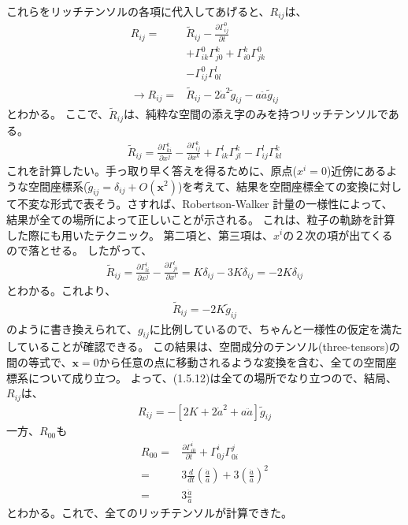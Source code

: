 \documentclass[11pt]{ltjsarticle}
\theoremstyle{plain}
\theoremstyle{break}
\newcommand{\tilg}{\tilde{g}}
\begin{document}
これらをリッチテンソルの各項に代入してあげると、$R_{ij}$は、
\begin{align}
  R_{ij} =&\tilde{R}_{ij}
  -\frac{\partial \Gamma_{i j}^{0}}{\partial t}\\
  &+\Gamma_{i k}^{0} \Gamma_{j 0}^{k}+\Gamma_{i 0}^{k} \Gamma_{j k}^{0} \\
  &-\Gamma_{i j}^{0} \Gamma_{0 l}^{l} \\
\rightarrow
  R_{ij} =&\tilde{R}_{ij} - 2 \dot{a}^2 \tilg_{ij} - a \ddot{a} \tilg_{ij}
\end{align}
とわかる。
ここで、$\tilde{R}_{ij}$は、純粋な空間の添え字のみを持つリッチテンソルである。
\begin{align}
\tilde{R}_{i j}=\frac{\partial \Gamma_{k i}^{k}}{\partial x^{j}}-\frac{\partial \Gamma_{i j}^{k}}{\partial x^{k}}+\Gamma_{i k}^{l} \Gamma_{j l}^{k}-\Gamma_{i j}^{l} \Gamma_{k l}^{k}
\end{align}%
これを計算したい。手っ取り早く答えを得るために、原点($x^i =0$)近傍にあるような空間座標系($\tilg_{ij} = \delta_{ij} + O(\mathbf{x}^2)$)を考えて、結果を空間座標全ての変換に対して不変な形式で表そう。さすれば、Robertson-Walker 計量の一様性によって、結果が全ての場所によって正しいことが示される。
これは、粒子の軌跡を計算した際にも用いたテクニック。
第二項と、第三項は、$x^i$の２次の項が出てくるので落とせる。
したがって、
\begin{align}
  \tilde{R}_{i j}=\frac{\partial \Gamma_{l i}^{l}}{\partial x^{j}}-\frac{\partial \Gamma_{j i}^{l}}{\partial x^{l}}=K \delta_{i j}-3 K \delta_{i j}=-2 K \delta_{i j}
 \end{align}%
とわかる。これより、
\begin{align}
 \tilde{R}_{i j}=-2 K \tilde{g}_{i j}
\end{align}%
のように書き換えられて、$g_{ij}$に比例しているので、ちゃんと一様性の仮定を満たしていることが確認できる。
この結果は、空間成分のテンソル(three-tensors)の間の等式で、$\mathbf{x} = 0$から任意の点に移動されるような変換を含む、全ての空間座標系について成り立つ。
よって、(1.5.12)は全ての場所でなり立つので、結局、$R_{ij}$は、
\begin{align}
 R_{i j}=-\left[2 K+2 \dot{a}^{2}+a \ddot{a}\right] \tilde{g}_{i j}
\end{align}%
一方、$R_{00}$も
\begin{align}
  R_{00}
  =& \frac{\partial \Gamma_{i 0}^{i}}{\partial t}+\Gamma_{0 j}^{i} \Gamma_{0 i}^{j} \\
  =&3 \frac{d}{d t}\left(\frac{\dot{a}}{a}\right)+3\left(\frac{\dot{a}}{a}\right)^{2} \\
  =& 3 \frac{\ddot{a}}{a}
\end{align}
とわかる。これで、全てのリッチテンソルが計算できた。
\end{document}
